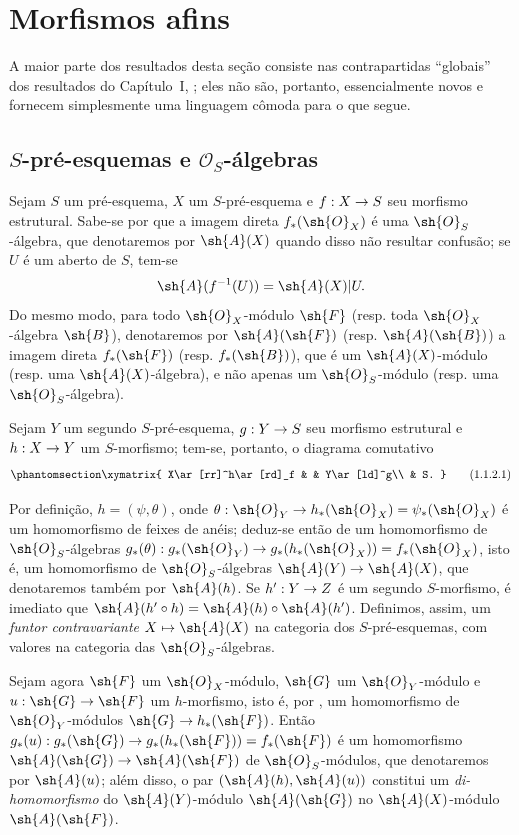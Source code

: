 \documentclass[oneside,10pt]{amsart}
\makeatletter
\newcommand{\ega@arrow}[2]{\mathchoice{#1}{#2}{#2}{#2}}
\let\ega@shortmapsto\mapsto
\renewcommand{\to}{\ega@arrow{\longrightarrow}{\rightarrow}}
\renewcommand{\mapsto}{\ega@arrow{\longmapsto}{\ega@shortmapsto}}
\newcommand{\oldpage}[2][]{\marginnote{\normalfont\footnotesize\textbf{#1}~|~#2}\ignorespaces}
\let\EGAOriginalLabel\label
\renewcommand{\label}[1]{\phantomsection\EGAOriginalLabel{#1}}
\makeatother
\begin{document}
\section{Morfismos afins}
\label{section:II.1}

A maior parte dos resultados desta seção consiste nas contrapartidas ``globais'' dos resultados do Capítulo~I, ; eles não são, portanto, essencialmente novos e fornecem simplesmente uma linguagem cômoda para o que segue.
\bigskip

\subsection{$S$-pré-esquemas e $\mathcal{O}_S$-álgebras}
\label{subsection:II.1.1}

\begin{env}[1.1.1]
\label{II.1.1.1}
Sejam $S$ um pré-esquema, $X$ um $S$-pré-esquema e $f:X\to S$ seu morfismo estrutural.
Sabe-se por  que a imagem direta $f_*(\sh{O}_X)$ é uma $\sh{O}_S$-álgebra, que
\oldpage[II]{6}
denotaremos por $\sh{A}(X)$ quando disso não resultar confusão; se $U$ é um aberto de $S$, tem-se
\[
  \sh{A}(f^{-1}(U))=\sh{A}(X)|U.
\]
Do mesmo modo, para todo $\sh{O}_X$-módulo $\sh{F}$ (resp. toda $\sh{O}_X$-álgebra $\sh{B}$), denotaremos por $\sh{A}(\sh{F})$ (resp. $\sh{A}(\sh{B})$) a imagem direta $f_*(\sh{F})$ (resp. $f_*(\sh{B})$), que é um $\sh{A}(X)$-módulo (resp. uma $\sh{A}(X)$-álgebra), e não apenas um $\sh{O}_S$-módulo (resp. uma $\sh{O}_S$-álgebra).
\end{env}

\begin{env}[1.1.2]
\label{II.1.1.2}
Sejam $Y$ um segundo $S$-pré-esquema, $g:Y\to S$ seu morfismo estrutural e $h:X\to Y$ um $S$-morfismo; tem-se, portanto, o diagrama comutativo
\[
\label{II.1.1.2.1}
  \xymatrix{
    X\ar[rr]^h\ar[rd]_f & &
    Y\ar[ld]^g\\
    & S.
  }
  \tag{1.1.2.1}
\]

Por definição, $h=(\psi,\theta)$, onde $\theta:\sh{O}_Y\to h_*(\sh{O}_X)=\psi_*(\sh{O}_X)$ é um homomorfismo de feixes de anéis; deduz-se então de  um homomorfismo de $\sh{O}_S$-álgebras $g_*(\theta):g_*(\sh{O}_Y)\to g_*(h_*(\sh{O}_X))=f_*(\sh{O}_X)$, isto é, um homomorfismo de $\sh{O}_S$-álgebras $\sh{A}(Y)\to\sh{A}(X)$, que denotaremos também por $\sh{A}(h)$.
Se $h':Y\to Z$ é um segundo $S$-morfismo, é imediato que $\sh{A}(h'\circ h)=\sh{A}(h)\circ\sh{A}(h')$.
Definimos, assim, um \emph{funtor contravariante $X\mapsto\sh{A}(X)$} na categoria dos $S$-pré-esquemas, com valores na categoria das $\sh{O}_S$-álgebras.

Sejam agora $\sh{F}$ um $\sh{O}_X$-módulo, $\sh{G}$ um $\sh{O}_Y$-módulo e $u:\sh{G}\to\sh{F}$ um $h$-morfismo, isto é, por , um homomorfismo de $\sh{O}_Y$-módulos $\sh{G}\to h_*(\sh{F})$.
Então $g_*(u):g_*(\sh{G})\to g_*(h_*(\sh{F}))=f_*(\sh{F})$ é um homomorfismo $\sh{A}(\sh{G})\to\sh{A}(\sh{F})$ de $\sh{O}_S$-módulos, que denotaremos por $\sh{A}(u)$; além disso, o par $(\sh{A}(h),\sh{A}(u))$ constitui um \emph{di-homomorfismo} do $\sh{A}(Y)$-módulo $\sh{A}(\sh{G})$ no $\sh{A}(X)$-módulo $\sh{A}(\sh{F})$.
\end{env}
\end{document}
